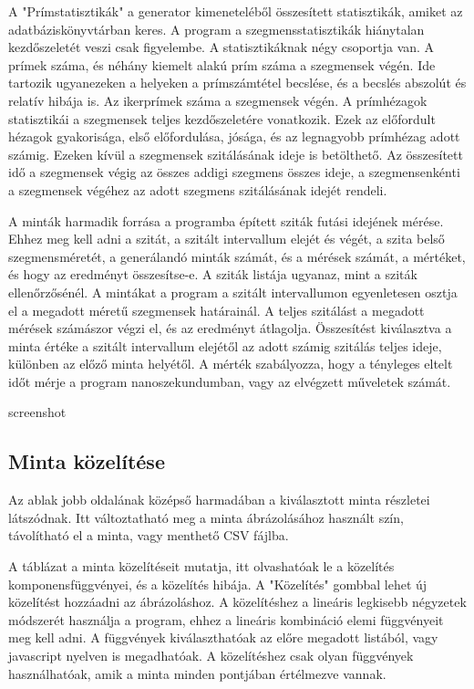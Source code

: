 \documentclass[12pt]{report}
\begin{document}
A "Prímstatisztikák" a generator kimeneteléből összesített statisztikák,
amiket az adatbáziskönyvtárban keres.
A program a szegmensstatisztikák hiánytalan kezdőszeletét veszi csak figyelembe.
A statisztikáknak négy csoportja van. A prímek száma, és néhány kiemelt alakú prím száma
a szegmensek végén. Ide tartozik ugyanezeken a helyeken a prímszámtétel
becslése, és a becslés abszolút és relatív hibája is.
Az ikerprímek száma a szegmensek végén.
A prímhézagok statisztikái a szegmensek teljes kezdőszeletére vonatkozik. Ezek
az előfordult hézagok gyakorisága, első előfordulása, jósága, és az legnagyobb
prímhézag adott számig.
Ezeken kívül a szegmensek szitálásának ideje is betölthető. Az összesített
idő a szegmensek végig az összes addigi szegmens összes ideje,
a szegmensenkénti a szegmensek végéhez az adott szegmens szitálásának idejét rendeli.

A minták harmadik forrása a programba épített sziták futási idejének mérése.
Ehhez meg kell adni a szitát, a szitált intervallum elejét és végét,
a szita belső szegmensméretét, a generálandó minták számát, és a mérések számát,
a mértéket, és hogy az eredményt összesítse-e.
A sziták listája ugyanaz, mint a sziták ellenőrzősénél.
A mintákat a program a szitált intervallumon egyenletesen osztja el a megadott méretű
szegmensek határainál. A teljes szitálást a megadott mérések számászor végzi el,
és az eredményt átlagolja.
Összesítést kiválasztva a minta értéke a szitált intervallum elejétől
az adott számig szitálás teljes ideje, különben az előző minta helyétől.
A mérték szabályozza, hogy a tényleges eltelt időt mérje a program nanoszekundumban,
vagy az elvégzett műveletek számát.

{\color{red}screenshot}

\subsection{Minta közelítése}

Az ablak jobb oldalának középső harmadában a kiválasztott minta részletei látszódnak.
Itt változtatható meg a minta ábrázolásához használt szín, távolítható el a minta,
vagy menthető CSV fájlba.

A táblázat a minta közelítéseit mutatja,
itt olvashatóak le a közelítés komponensfüggvényei, és a közelítés hibája.
A "Közelítés" gombbal lehet új közelítést hozzáadni az ábrázoláshoz.
A közelítéshez a lineáris legkisebb négyzetek módszerét használja a program,
ehhez a lineáris kombináció elemi függvényeit meg kell adni.
A függvények kiválaszthatóak az előre megadott listából,
vagy javascript nyelven is megadhatóak.
A közelítéshez csak olyan függvények használhatóak, amik a minta
minden pontjában értélmezve vannak.
\end{document}
